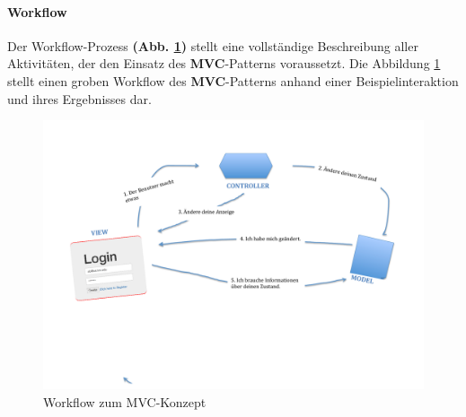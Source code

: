 \paragraph{Workflow}

Der Workflow-Prozess \textbf{(Abb. \ref{img:mvc})} stellt eine vollständige Beschreibung aller Aktivitäten, der den Einsatz des \textbf{MVC}-Patterns voraussetzt. Die Abbildung \ref{img:mvc} stellt einen groben Workflow des \textbf{MVC}-Patterns anhand einer Beispielinteraktion und ihres Ergebnisses dar.
\begin{figure}[H]
\centering
\includegraphics[trim = 0mm 60mm 0mm 20mm, clip, width=1.0\textwidth]{resources/mvc}
\caption[Workflow zum MVC-Konzept]{Workflow zum MVC-Konzept}
\label{img:mvc}
\end{figure}

